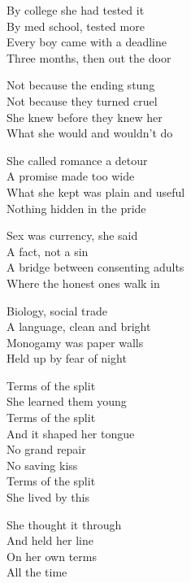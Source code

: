 \begin{lyrics}
By college she had tested it\\
By med school, tested more\\
Every boy came with a deadline\\
Three months, then out the door

Not because the ending stung\\
Not because they turned cruel\\
She knew before they knew her\\
What she would and wouldn’t do

She called romance a detour\\
A promise made too wide\\
What she kept was plain and useful\\
Nothing hidden in the pride

Sex was currency, she said\\
A fact, not a sin\\
A bridge between consenting adults\\
Where the honest ones walk in

Biology, social trade\\
A language, clean and bright\\
Monogamy was paper walls\\
Held up by fear of night

Terms of the split\\
She learned them young\\
Terms of the split\\
And it shaped her tongue\\
No grand repair\\
No saving kiss\\
Terms of the split\\
She lived by this

She thought it through\\
And held her line\\
On her own terms\\
All the time
\end{lyrics}

